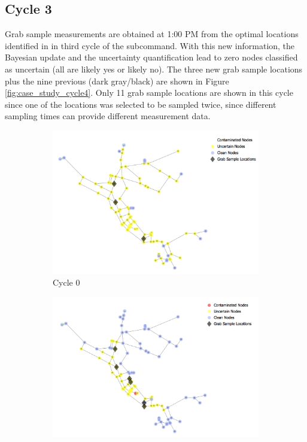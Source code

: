 \subsection{Cycle 3}
Grab sample measurements are obtained at 1:00 PM from the optimal locations identified in in third cycle of the  subcommand. 
With this new information, the Bayesian update and the uncertainty quantification lead to zero nodes classified as uncertain (all are likely yes or likely no). The three new grab sample locations plus the nine previous (dark gray/black) are shown in Figure \ref{fig:case_study_cycle4}. Only 11 grab sample locations are shown in this cycle since one of the locations was selected to be sampled twice, since different sampling times can provide different measurement data. 

\begin{figure}[!h]
\centering
\begin{subfigure}{0.49\textwidth}
\centering
\includegraphics[width = \textwidth]{graphics/sampling_cs_cycle1.png}
\caption{Cycle 0}
\label{fig:case_study_cycle1}
\end{subfigure}
\begin{subfigure}{0.49\textwidth}
\centering
\includegraphics[width = \textwidth]{graphics/sampling_cs_cycle2.png}

\end{subfigure}
\end{figure}
